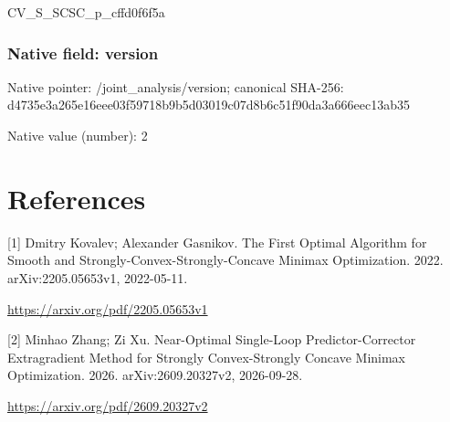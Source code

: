 \documentclass[10pt,a4paper]{article}
\begin{document}
CV\_S\_SCSC\_p\_cffd0f6f5a


\subsubsection{Native field: version}


Native pointer: /joint\_analysis/version; canonical SHA-256: d4735e3a265e16eee03f5971\allowbreak{}8b9b5d03019c07d8b6c51f90\allowbreak{}da3a666eec13ab35



Native value (number): 2



\section{References}


[1] Dmitry Kovalev; Alexander Gasnikov. The First Optimal Algorithm for Smooth and Strongly-Convex-Strongly-Concave Minimax Optimization. 2022. arXiv:2205.05653v1, 2022-05-11.



\url{https://arxiv.org/pdf/2205.05653v1}



[2] Minhao Zhang; Zi Xu. Near-Optimal Single-Loop Predictor-Corrector Extragradient Method for Strongly Convex-Strongly Concave Minimax Optimization. 2026. arXiv:2609.20327v2, 2026-09-28.



\url{https://arxiv.org/pdf/2609.20327v2}
\end{document}

